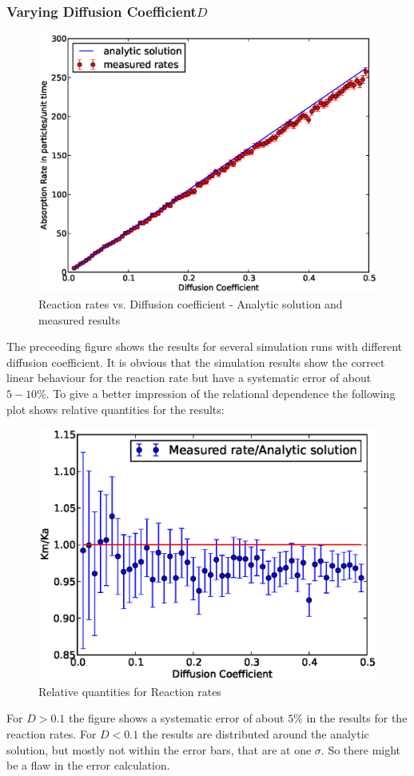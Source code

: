 \subsubsection{Varying Diffusion Coefficient$D$}
\begin{figure}[H]
    \centering
    \includegraphics[width=.7 \textwidth, keepaspectratio]{plots/np/d/Kabs.eps}
    \caption{Reaction rates vs. Diffusion coefficient - Analytic solution and measured results}
    \label{fig:Kabs_D}
\end{figure}
The preceeding figure shows the results for several simulation runs with different diffusion coefficient. It is obvious that the simulation results show the correct linear behaviour for the reaction rate but have a systematic error of about $5 - 10 \%$. To give a better impression of the relational dependence the following plot shows relative quantities for the results:
\begin{figure}[H]
    \centering
    \includegraphics[width = .7 \textwidth, keepaspectratio]{plots/np/d/Krel.eps}
    \caption{Relative quantities for Reaction rates}
    \label{fig:Krel_d}
\end{figure}
For $D > 0.1$ the figure shows a systematic error of about $5 \%$ in the results for the reaction rates. For $D<0.1$ the results are distributed around the analytic solution, but mostly not within the error bars, that are at one $\sigma$. So there might be a flaw in the error calculation.

